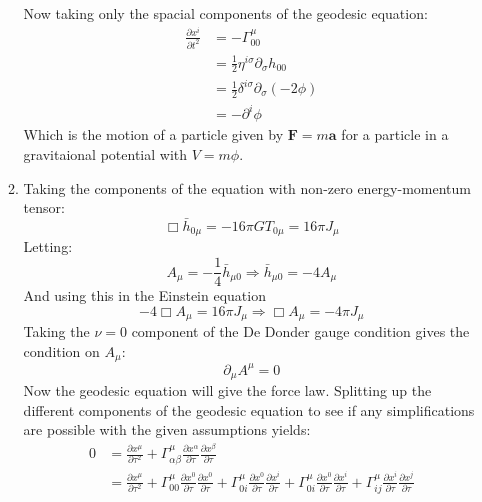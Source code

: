 \documentclass[12pt,a4]{article}
\begin{document}
\begin{enumerate}
\begin{enumerate}
\begin{equation*}
        \end{equation*}
        Now taking only the spacial components of the geodesic equation:
        \begin{align*}
          \frac{\partial x^i}{\partial t^2} &= -\Gamma^\mu_{00} \\
                                            &= \frac{1}{2}  \eta^{i \sigma} \partial_\sigma h_{0 0}\\
                                            &= \frac{1}{2}  \delta^{i \sigma} \partial_\sigma (-2 \phi)\\
                                            &= - \partial^i \phi
        \end{align*}
        Which is the motion of a particle given by $\mathbf{F} = m \mathbf{a}$ for a particle in a gravitaional potential with $V = m \phi$.
      \item
        Taking the components of the equation with non-zero energy-momentum tensor:
        \begin{equation*}
          \Box \bar{h}_{0\mu} = - 16\pi G T_{0\mu} = 16 \pi J_{\mu}
        \end{equation*}
        Letting:
        \begin{equation*}
          A_\mu = - \frac{1}{4} \bar{h}_{\mu0} \Rightarrow \bar{h}_{\mu 0} = - 4 A_\mu 
        \end{equation*}
        And using this in the Einstein equation
        \begin{equation*}
          -4 \Box A_\mu = 16 \pi J_{\mu} \Rightarrow \Box A_\mu  = -4 \pi J_{\mu}
        \end{equation*}
        Taking the $\nu = 0$ component of the De Donder gauge condition gives the condition on $A_\mu$:
        \begin{equation*}
          \partial_\mu A^\mu = 0
        \end{equation*}
        Now the geodesic equation will give the force law.
        Splitting up the different components of the geodesic equation to see if any simplifications are possible with the given assumptions yields:
        \begin{align*}
          0 &= \frac{\partial x^\mu}{\partial \tau^2} + \Gamma^\mu_{\alpha \beta} \frac{\partial x^\alpha}{\partial \tau} \frac{\partial x^\beta}{\partial \tau}\\
            &= \frac{\partial x^\mu}{\partial \tau^2} + \Gamma^\mu_{00} \frac{\partial x^0}{\partial \tau} \frac{\partial x^0}{\partial \tau} + \Gamma^\mu_{0i} \frac{\partial x^0}{\partial \tau} \frac{\partial x^i}{\partial \tau} + \Gamma^\mu_{0i} \frac{\partial x^0}{\partial \tau} \frac{\partial x^i}{\partial \tau} +  \Gamma^\mu_{ij} \frac{\partial x^i}{\partial \tau} \frac{\partial x^j}{\partial \tau}\\

\end{align*}
\end{enumerate}
\end{enumerate}
\end{document}
